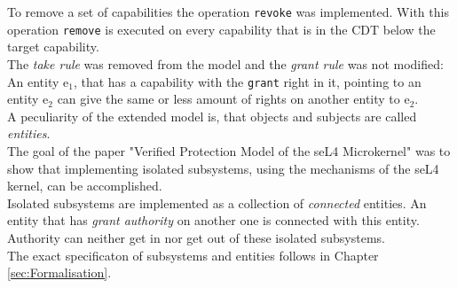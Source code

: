 To remove a set of capabilities the operation \texttt{revoke} was implemented. With this operation \texttt{remove} is executed on every capability that is in the CDT below the target capability. \\
The \textit{take rule} was removed from the model and the \textit{grant rule} was not modified: \\
An entity e$_1$, that has a capability with the \texttt{grant} right in it, pointing to an entity e$_2$ can give the same or less amount of rights on another entity to e$_2$. \\ 
A peculiarity of the extended model is, that objects and subjects are called \textit{entities}.\\
The goal of the paper "Verified Protection Model of the seL4 Microkernel" was to show that implementing isolated subsystems, using the mechanisms of the seL4 kernel, can be accomplished. \cite{TakeG} \\
Isolated subsystems are implemented as a collection of \textit{connected} entities. An entity that has \textit{grant authority} on another one is connected with this entity. Authority can neither get in nor get out of these isolated subsystems.\\
The exact specificaton of subsystems and entities follows in Chapter \ref{sec:Formalisation}.